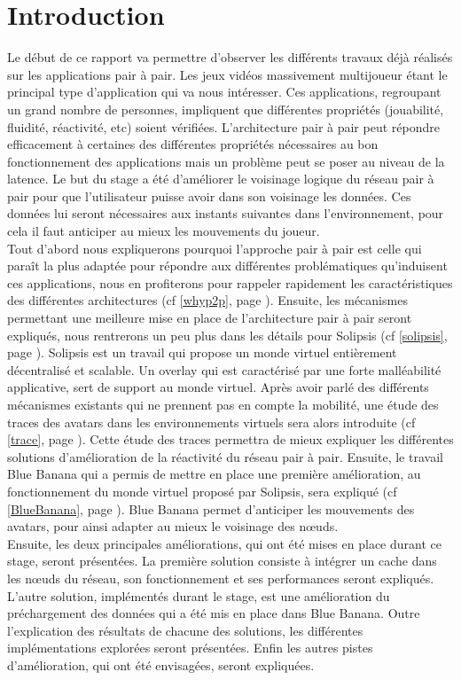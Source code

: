 \section{Introduction}
	Le début de ce rapport va permettre d'observer les différents travaux déjà réalisés sur les applications pair à pair. Les jeux vidéos massivement multijoueur étant le principal type d'application qui va nous intéresser. Ces applications, regroupant un grand nombre de personnes, impliquent que différentes propriétés (jouabilité, fluidité, réactivité, etc) soient vérifiées. L'architecture pair à pair peut répondre efficacement à certaines des différentes propriétés nécessaires au bon fonctionnement des applications mais un problème peut se poser au niveau de la latence. Le but du stage a été d'améliorer le voisinage logique du réseau pair à pair pour que l'utilisateur puisse avoir dans son voisinage les données. Ces données lui seront nécessaires aux instants suivantes dans l'environnement, pour cela il faut anticiper au mieux les mouvements du joueur.\\

	Tout d'abord nous expliquerons pourquoi l'approche pair à pair est celle qui paraît la plus adaptée pour répondre aux différentes problématiques qu'induisent ces applications, nous en profiterons pour rappeler rapidement les caractéristiques des différentes architectures (cf \ref{whyp2p}, page \pageref{whyp2p}). Ensuite, les mécanismes permettant une meilleure mise en place de l'architecture pair à pair seront expliqués, nous rentrerons un peu plus dans les détails pour Solipsis (cf \ref{solipsis}, page \pageref{solipsis}). Solipsis est un travail qui propose un monde virtuel entièrement décentralisé et scalable. Un overlay qui est caractérisé par une forte malléabilité applicative, sert de support au monde virtuel. Après avoir parlé des différents mécanismes existants qui ne prennent pas en compte la mobilité, une étude des traces des avatars dans les environnements virtuels sera alors introduite (cf \ref{trace}, page \pageref{trace}). Cette étude des traces permettra de mieux expliquer les différentes solutions d'amélioration de la réactivité du réseau pair à pair. Ensuite, le travail Blue Banana qui a permis de mettre en place une première amélioration, au fonctionnement du monde virtuel proposé par Solipsis, sera expliqué (cf \ref{BlueBanana}, page \pageref{BlueBanana}). Blue Banana permet d'anticiper les mouvements des avatars, pour ainsi adapter au mieux le voisinage des nœuds. \\

	
	Ensuite, les deux principales améliorations, qui ont été mises en place durant ce stage, seront présentées. La première solution consiste à intégrer un cache dans les nœuds du réseau, son fonctionnement et ses performances seront expliqués. L'autre solution, implémentés durant le stage, est une amélioration du préchargement des données qui a été mis en place dans Blue Banana. Outre l'explication des résultats de chacune des solutions, les différentes implémentations explorées seront présentées. Enfin les autres pistes d'amélioration, qui ont été envisagées, seront expliquées.

